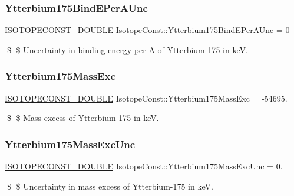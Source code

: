 \subsubsection{\texorpdfstring{Ytterbium175\+Bind\+E\+Per\+A\+Unc}{Ytterbium175BindEPerAUnc}}
{\footnotesize\ttfamily \mbox{\hyperlink{group___isotope_const-_macros_ga8f45a7272ce02c0b4c65c44636ed719a}{I\+S\+O\+T\+O\+P\+E\+C\+O\+N\+S\+T\+\_\+\+D\+O\+U\+B\+LE}} Isotope\+Const\+::\+Ytterbium175\+Bind\+E\+Per\+A\+Unc = 0}

\$ \$ Uncertainty in binding energy per A of Ytterbium-\/175 in keV. \mbox{\label{group___isotope_const-_ytterbium-_yb175_gad49fa45c44f28e4eb9bb3c4eb1888ca9}} 
\subsubsection{\texorpdfstring{Ytterbium175\+Mass\+Exc}{Ytterbium175MassExc}}
{\footnotesize\ttfamily \mbox{\hyperlink{group___isotope_const-_macros_ga8f45a7272ce02c0b4c65c44636ed719a}{I\+S\+O\+T\+O\+P\+E\+C\+O\+N\+S\+T\+\_\+\+D\+O\+U\+B\+LE}} Isotope\+Const\+::\+Ytterbium175\+Mass\+Exc = -\/54695.}

\$ \$ Mass excess of Ytterbium-\/175 in keV. \mbox{\label{group___isotope_const-_ytterbium-_yb175_ga232884a8726b42ab71b293b3bda47ac6}} 
\subsubsection{\texorpdfstring{Ytterbium175\+Mass\+Exc\+Unc}{Ytterbium175MassExcUnc}}
{\footnotesize\ttfamily \mbox{\hyperlink{group___isotope_const-_macros_ga8f45a7272ce02c0b4c65c44636ed719a}{I\+S\+O\+T\+O\+P\+E\+C\+O\+N\+S\+T\+\_\+\+D\+O\+U\+B\+LE}} Isotope\+Const\+::\+Ytterbium175\+Mass\+Exc\+Unc = 0.}

\$ \$ Uncertainty in mass excess of Ytterbium-\/175 in keV. \mbox{\label{group___isotope_const-_ytterbium-_yb175_ga27f2d8555f8528b1ac5ed8b895b89ff8}} 

